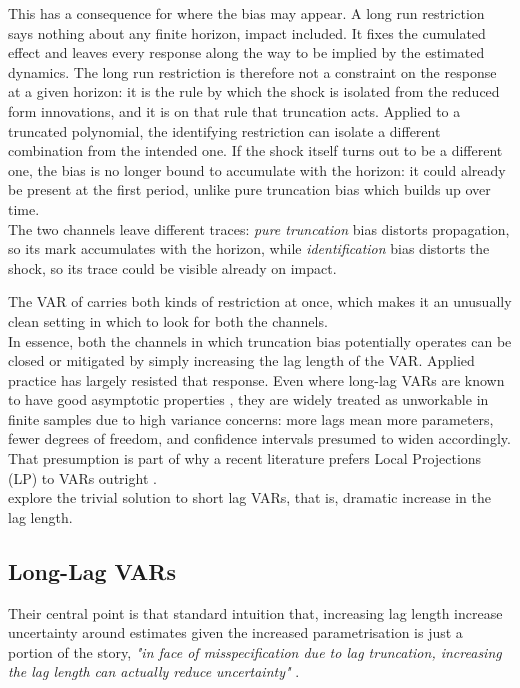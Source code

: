 \documentclass[12pt, a4paper]{article}
\begin{document}
This has a consequence for where the bias may appear. A long
run restriction says nothing about any finite horizon, impact included. It fixes the cumulated
effect and leaves every response along the way to be implied by the estimated dynamics.
The long run restriction is therefore not a constraint on the response at a given horizon: 
it is the rule by which the shock is isolated from the reduced form innovations, 
and it is on that rule that truncation acts. Applied to a truncated polynomial, the identifying restriction 
can isolate a different combination from the intended one. If the shock itself 
turns out to be a different one, the bias is no longer bound to accumulate with 
the horizon: it could already be present at the first period, unlike pure truncation bias 
which builds up over time.
\\

The two channels leave different traces: \textit{pure truncation} bias
distorts propagation, so its mark accumulates with the horizon, while \textit{identification} bias distorts
the shock, so its trace could be visible already on impact.

The VAR of \citet{ACEL2011} carries both kinds of restriction at once, which makes it an unusually
clean setting in which to look for both the channels.
\\

In essence, both the channels in which truncation bias potentially operates can be 
closed or mitigated by simply increasing the lag length of the VAR.
Applied practice has largely resisted that response. Even where long-lag
VARs are known to have good asymptotic properties \citep{Plagborg-Moller_Wolf2021},
they are widely treated as unworkable in finite samples due to high variance concerns: 
more lags mean more parameters, fewer degrees of freedom, and confidence intervals 
presumed to widen accordingly. That presumption is part of why a recent literature 
prefers Local Projections (LP) to VARs outright \citep{Li_PlagborgMoller_Wolf2024, 
Montiel-Olea_Plagborg-Moller_Qian_Wolf2025}.
\\

\citet{Long_Lag2025} explore the trivial solution to short lag VARs, that is, dramatic increase in the 
lag length.

\subsection{Long-Lag VARs}
\label{sec:long-lag_VARs}
Their central point is that standard intuition that, increasing lag length increase uncertainty around 
estimates given the increased parametrisation is just a portion of the story, 
\textit{"in face of misspecification due to lag truncation, increasing the lag 
length can actually reduce uncertainty"} \citep[p.~2]{Long_Lag2025}.
\end{document}
